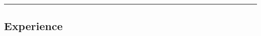 \documentclass[10pt,letterpaper]{article}
\begin{document}
\begin{itemize}
\begin{itemize*}
	\end{itemize*}

\end{itemize}


\hrule
\vspace{-0.4em}
\subsection*{Experience}
\end{document}
